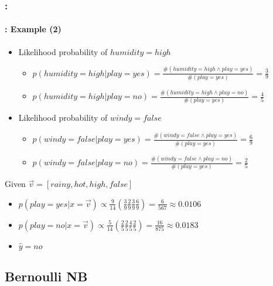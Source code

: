 \documentclass[xcolor=table]{beamer}
\begin{document}
\begin{frame}
	\frametitle{\insertshortsubtitle: \insertsection}
	\framesubtitle{\insertsubsection: Example (2)}
	
	\begin{itemize}
		\item Likelihood probability of $ humidity=high $
		\begin{itemize}
			\item $p(humidity=high|play=yes) = \frac{\#(humidity=high \wedge play = yes)}{\#(play = yes)} = \frac{3}{9}$
			\item $p(humidity=high|play=no) = \frac{\#(humidity=high \wedge play = no)}{\#(play = yes)} = \frac{4}{5}$
		\end{itemize}
		\item Likelihood probability of $ windy=false $
		\begin{itemize}
			\item $p(windy=false|play=yes) = \frac{\#(windy=false \wedge play = yes)}{\#(play = yes)} = \frac{6}{9}$
			\item $p(windy=false|play=no) = \frac{\#(windy=false \wedge play = no)}{\#(play = yes)} = \frac{2}{5}$
		\end{itemize}
	\end{itemize}
	
	\vfill
	Given $ \vec{v} = [rainy, hot, high, false]$
	\begin{itemize}
		\item $p(play=yes|x=\vec{v}) \propto \frac{9}{14} (\frac{3}{9} \frac{2}{9} \frac{3}{9} \frac{6}{9}) = \frac{6}{567} \approx 0.0106$
		\item $p(play=no|x=\vec{v}) \propto \frac{5}{14} (\frac{2}{5} \frac{2}{5} \frac{4}{5} \frac{2}{5}) = \frac{16}{875} \approx 0.0183$
		\item $ \hat{y} = no $
	\end{itemize}
	
\end{frame}


\subsection{Bernoulli NB}
\end{document}
